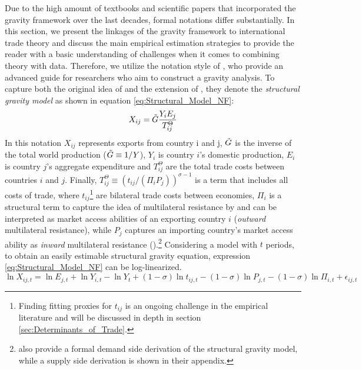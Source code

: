 Due to the high amount of textbooks and scientific papers that incorporated the gravity framework over the last decades, formal notations differ substantially. In this section, we present the linkages of the gravity framework to international trade theory and discuss the main empirical estimation strategies to provide the reader with a basic understanding of challenges when it comes to combining theory with data. Therefore, we utilize the notation style of \textcite[p. 17]{yotov2016advanced}, who provide an advanced guide for researchers who aim to construct a gravity analysis. To capture both the original idea of \textcite{tinbergen1962shaping} and the extension of \textcite{Anderson2003}, they denote the \textit{structural gravity model} as shown in equation \ref{eq:Structural_Model_NF}: \begin{equation}
    \label{eq:Structural_Model_NF}
    X_{ij} = \Tilde{G} \frac{Y_i E_j }{T_{ij}^{\Theta}}
\end{equation} In this notation $X_{ij}$ represents exports from country i and j, $\Tilde{G}$ is the inverse of the total world production ($\Tilde{G} \equiv 1/Y$), $Y_i$ is country $i$'s domestic production, $E_i$ is country $j$'s aggregate expenditure and $T_{ij}^{\Theta}$ are the total trade costs between countries $i$ and $j$. Finally, $T_{ij}^{\Theta} \equiv \left( t_{ij}/(\Pi_i P_j) \right)^{\sigma - 1}$ is a term that includes all costs of trade, where $t_{ij}$\footnote{Finding fitting proxies for $t_{ij}$ is an ongoing challenge in the empirical literature and will be discussed in depth in section \ref{sec:Determinants_of_Trade}.} are bilateral trade costs between economies, $\Pi_i$ is a structural term to capture the idea of multilateral resistance by \textcite{Anderson2003} and can be interpreted as market access abilities of an exporting country $i$ (\textit{outward} multilateral resistance), while $P_j$ captures an importing country's market access ability as \textit{inward} multilateral resistance (\cite[p. 16]{yotov2016advanced}).\footnote{\textcite[pp. 13-17]{yotov2016advanced} also provide a formal demand side derivation of the structural gravity model, while a supply side derivation is shown in their appendix.} Considering a model with $t$ periods, to obtain an easily estimable structural gravity equation, expression \ref{eq:Structural_Model_NF} can be log-linearized. \begin{equation}
    \label{eq:Structural_Model_LIN}
    \ln{X_{ij,t}} = \ln{E_{j,t}} + \ln{Y_{i,t}} - \ln{Y_t} + (1-\sigma) \ln{t_{ij,t}} - (1-\sigma) \ln{P_{j,t}} - (1-\sigma) \ln{\Pi_{i,t}} + \epsilon_{ij,t}

\end{equation}
